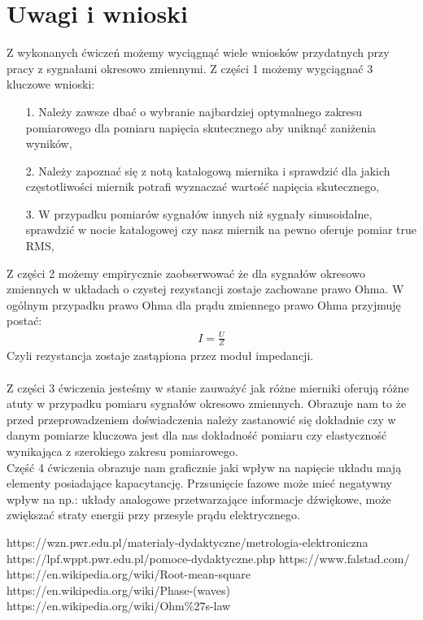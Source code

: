 \documentclass[11pt]{article}
\begin{document}
    \section{Uwagi i wnioski}
    Z wykonanych ćwiczeń możemy wyciągnąć wiele wniosków przydatnych przy pracy z sygnałami okresowo zmiennymi. Z części 1 możemy wygciągnać 3 kluczowe wnioski:
    \begin{itemize}
        \item[1.] Należy zawsze dbać o wybranie najbardziej optymalnego zakresu pomiarowego dla pomiaru napięcia skutecznego aby uniknąć zaniżenia wyników,
        \item[2.] Należy zapoznać się z notą katalogową miernika i sprawdzić dla jakich częstotliwości miernik potrafi wyznaczać wartość napięcia skutecznego,
        \item[3.] W przypadku pomiarów sygnałów innych niż sygnały sinusoidalne, sprawdzić w nocie katalogowej czy nasz miernik na pewno oferuje pomiar true RMS,
    \end{itemize}
    \newpage
    \indent Z części 2 możemy empirycznie zaobserwować że dla sygnałów okresowo zmiennych w układach o czystej rezystancji zostaje zachowane prawo Ohma. W ogólnym przypadku prawo Ohma dla
    prądu zmiennego prawo Ohma przyjmuję postać:
    \begin{gather*}
        I=\frac{U}{Z}
    \end{gather*}
    Czyli rezystancja zostaje zastąpiona przez moduł impedancji.\\\\
    \indent Z części 3 ćwiczenia jesteśmy w stanie zauważyć jak różne mierniki oferują różne atuty w przypadku pomiaru sygnałów okresowo zmiennych. Obrazuje nam to że przed przeprowadzeniem
    doświadczenia należy zastanowić się dokładnie czy w danym pomiarze kluczowa jest dla nas dokładność pomiaru czy elastyczność wynikająca z szerokiego zakresu pomiarowego.\\
    \indent Część 4 ćwiczenia obrazuje nam graficznie jaki wpływ na napięcie układu mają elementy posiadające kapacytancję. Przsunięcie fazowe może mieć negatywny wpływ na np.:
    układy analogowe przetwarzające informacje dźwiękowe, może zwiększać straty energii przy przesyle prądu elektrycznego.

    \vfill
    \footnotesize
    \begin{thebibliography}{9}
        https://wzn.pwr.edu.pl/materialy-dydaktyczne/metrologia-elektroniczna
        https://lpf.wppt.pwr.edu.pl/pomoce-dydaktyczne.php
        https://www.falstad.com/
        https://en.wikipedia.org/wiki/Root-mean-square
        https://en.wikipedia.org/wiki/Phase-(waves)
        https://en.wikipedia.org/wiki/Ohm\%27s-law
    \end{thebibliography}
\end{document}
